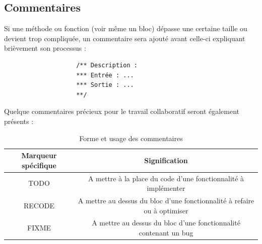 \documentclass[a4paper]{memoir}
\begin{document}
			\subsection{Commentaires}
				Si une méthode ou fonction (voir même un bloc) dépasse une certaine taille ou devient trop compliquée, un commentaire sera ajouté avant 
				celle-ci expliquant brièvement son processus :
				\begin{verbatim}
					/** Description :
					*** Entrée : ...
					*** Sortie : ...
					**/
				\end{verbatim}
				Quelque commentaires précieux pour le travail collaboratif seront également présents :
				\begin{table}[H]
					\begin{small}
						\hspace{-0,5cm}
						\begin{tabular}{| c | c |}
							\hline
							\textbf{Marqueur spécifique} & \textbf{Signification}\\
							\hline
							TODO & A mettre à la place du code d'une fonctionnalité à implémenter\\
							\hline
							RECODE & A mettre au dessus du bloc d'une fonctionnalité à refaire ou à optimiser\\
							\hline
							FIXME & A mettre au dessus du bloc d'une fonctionnalité contenant un bug\\
							\hline
						\end{tabular}
					\end{small}
					\label{tab:commentaire}
					\caption{Forme et usage des commentaires}
				\end{table}
\end{document}
